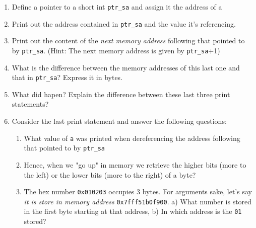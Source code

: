 \documentclass{article}
\begin{document}
\begin{enumerate}
\begin{enumerate}[label=\arabic*]
			\item Define a pointer to a short int \texttt{ptr\_sa} and assign it the address of a
			\item Print out the address contained in \texttt{ptr\_sa} and the value it's referencing.
			\item Print out the content of the \textit{next memory address} following that pointed to by \texttt{ptr\_sa}. (Hint: The next memory address is given by \texttt{ptr\_sa}+1)
			\item What is the difference between the memory addresses of this last one and that in \texttt{ptr\_sa}? Express it in bytes.
			\item What did hapen? Explain the difference between these last three print statements?
			\item Consider the last print statement and answer the following questions:
                \begin{enumerate}[label=\arabic*]
				\item What value of \texttt{a} was printed when dereferencing the address following that pointed to by \texttt{ptr\_sa}
                \item Hence, when we "go up" in memory we retrieve the higher bits (more to the left) or the lower bits (more to the right) of a byte?
                \item The hex number \texttt{0x010203} occupies 3 bytes. For arguments sake, let's say \textit{it is store in memory address} \texttt{0x7fff51b0f900}. 
                    a) What number is stored in the first byte starting at that address, b) In which address is the \texttt{01} stored?
			\end{enumerate}
	\end{enumerate}
\end{enumerate}
\end{document}
